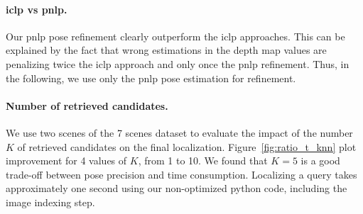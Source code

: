 \paragraph{\ac{iclp} vs \ac{pnlp}.} Our \ac{pnlp} pose refinement clearly outperform the \ac{iclp} approaches. This can be explained by the fact that wrong estimations in the depth map values are penalizing twice the \ac{iclp} approach and only once the \ac{pnlp} refinement. Thus, in the following, we use only the \ac{pnlp} pose estimation for refinement.

\paragraph{Number of retrieved candidates.} We use two scenes of the 7 scenes dataset to evaluate the impact of the number $K$ of retrieved candidates on the final localization. Figure~\ref{fig:ratio_t_knn} plot improvement for 4 values of $K$, from 1 to 10. We found that $K=5$ is a good trade-off between pose precision and time consumption. Localizing a query takes approximately one second using our non-optimized python code, including the image indexing step.